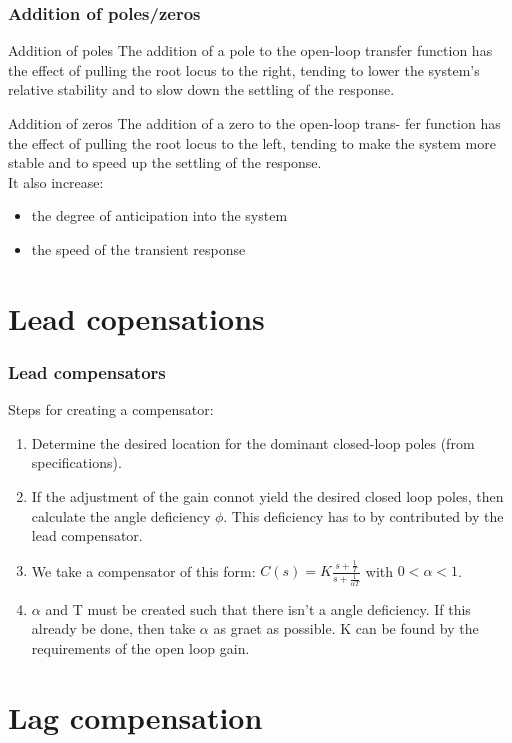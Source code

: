 \begin{frame}
	\frametitle{Addition of poles/zeros}
	 \begin{block}{Addition of poles}
	 	The addition of a pole to the open-loop transfer function has the effect of pulling the root locus to the right, tending to lower the system's relative stability and to slow down the settling of the response.
	 \end{block}
	 \begin{block}{Addition of zeros}
	 	The addition of a zero to the open-loop trans- fer function has the effect of pulling the root locus to the left, tending to make the system more stable and to speed up the settling of the response.\\
	 	It also increase:
	 	\begin{itemize}
	 		\item the degree of anticipation into the system
	 		\item the speed of the transient response
	 	\end{itemize}
	 \end{block}
\end{frame}

\section{Lead copensations}

\begin{frame}
	\frametitle{Lead compensators}
		Steps for creating a compensator: 
		\begin{enumerate}
			\item Determine the desired location for the dominant closed-loop poles (from specifications). 
			\item If the adjustment of the gain connot yield the desired closed loop poles, then calculate the angle deficiency $\phi$. This deficiency has to by contributed by the lead compensator.
			\item We take a compensator of this form: $C(s)=K\frac{s+\frac{1}{T}}{s+\frac{1}{\alpha T}}$ with $0<\alpha<1$. 
			\item $\alpha$ and T must be created such that there isn't a angle deficiency. If this already be done, then take $\alpha$ as graet as possible. K can be found by the requirements of the open loop gain.
		\end{enumerate}
\end{frame}

\section{Lag compensation}

